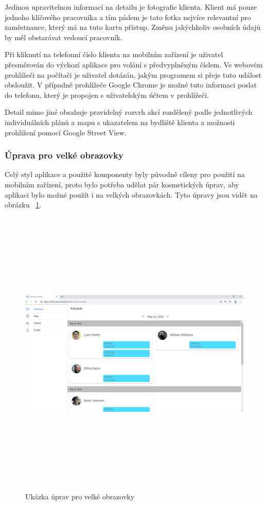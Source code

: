 \documentclass[
  glossaries,
]{kidiplom}
\begin{document}
Jedinou upravitelnou informací na detailu je fotografie klienta. Klient má pouze jednoho klíčového pracovníka a tím pádem je tato fotka nejvíce relevantní pro zaměstnance, který má na tuto kartu přístup. Změnu jakýchkoliv osobních údajů by měl obstarávat vedoucí pracovník. 

Při kliknutí na telefonní číslo klienta na mobilním zařízení je uživatel přesměrován do výchozí aplikace pro volání s předvyplněným číslem. Ve webovém prohlížeči na počítači je uživatel dotázán, jakým programem si přeje tuto událost obsloužit. V případně prohlížeče Google Chrome je možné tuto informaci poslat do telefonu, který je propojen s uživatelským účtem v prohlížeči.

Detail mimo jiné obsahuje pravidelný rozvrh akcí rozdělený podle jednotlivých individuálních plánů a mapu s ukazatelem na bydliště klienta a možnosti prohlížení pomocí Google Street View.

\subsubsection{Úprava pro velké obrazovky}
Celý styl aplikace a použité komponenty byly původně cíleny pro použití na mobilním zařízení, proto bylo potřeba udělat pár kosmetických úprav, aby aplikaci bylo možné použít i na velkých obrazovkách. Tyto úpravy jsou vidět na obrázku ~\ref{fig:bigScreen}. 

\begin{figure}[H]
  	\centering
 	 \includegraphics[width=14cm,height=14cm,keepaspectratio]{big_screen}
 	 \caption{Ukázka úprav pro velké obrazovky}
 	 \label{fig:bigScreen}
\end{figure}
\end{document}
